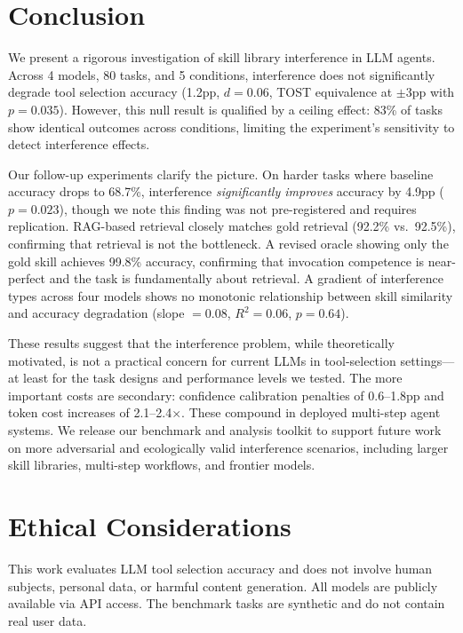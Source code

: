\documentclass[11pt]{article}
\begin{document}
\section{Conclusion}

We present a rigorous investigation of skill library interference in LLM agents. Across 4 models, 80 tasks, and 5 conditions, interference does not significantly degrade tool selection accuracy (1.2pp, $d = 0.06$, TOST equivalence at $\pm$3pp with $p = 0.035$). However, this null result is qualified by a ceiling effect: 83\% of tasks show identical outcomes across conditions, limiting the experiment's sensitivity to detect interference effects.

Our follow-up experiments clarify the picture. On harder tasks where baseline accuracy drops to 68.7\%, interference \emph{significantly improves} accuracy by 4.9pp ($p = 0.023$), though we note this finding was not pre-registered and requires replication. RAG-based retrieval closely matches gold retrieval (92.2\% vs.\ 92.5\%), confirming that retrieval is not the bottleneck. A revised oracle showing only the gold skill achieves 99.8\% accuracy, confirming that invocation competence is near-perfect and the task is fundamentally about retrieval. A gradient of interference types across four models shows no monotonic relationship between skill similarity and accuracy degradation (slope $= 0.08$, $R^2 = 0.06$, $p = 0.64$).

These results suggest that the interference problem, while theoretically motivated, is not a practical concern for current LLMs in tool-selection settings---at least for the task designs and performance levels we tested. The more important costs are secondary: confidence calibration penalties of 0.6--1.8pp and token cost increases of 2.1--2.4$\times$. These compound in deployed multi-step agent systems. We release our benchmark and analysis toolkit to support future work on more adversarial and ecologically valid interference scenarios, including larger skill libraries, multi-step workflows, and frontier models.


\section*{Ethical Considerations}

This work evaluates LLM tool selection accuracy and does not involve human subjects, personal data, or harmful content generation. All models are publicly available via API access. The benchmark tasks are synthetic and do not contain real user data.
\end{document}
